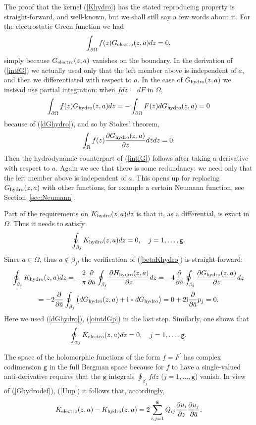 \documentclass[reqno,12pt]{article}
\theoremstyle{plain}
\theoremstyle{definition}
\numberwithin{equation}{section}
\numberwithin{figure}{section}
\def\I{\mathrm{i}}
\begin{document}
The proof that the kernel (\ref{Khydro}) has the stated reproducing property is straight-forward, and well-known,
but we shall still say a few words about it.
For the electrostatic Green function we had
$$
\int_{\partial\Omega}f(z)G_{\rm electro}(z,a)dz=0,
$$
simply because $G_{\rm electro}(z,a)$ vanishes on the boundary. In the derivation of (\ref{intfG}) we actually used only
that the left member above is independent of $a$, and then we differentiated with respect to $a$. In the case of 
$G_{\rm hydro}(z,a)$ we instead use partial integration: when $fdz=dF$ in $\Omega$,
$$
\int_{\partial \Omega}f(z)G_{\rm hydro}(z,a)dz=-\int_{\partial\Omega}F(z)dG_{\rm hydro}(z,a)=0
$$
because of (\ref{dGhydro}), and so by Stokes' theorem,
$$
\int_{ \Omega}f(z)\frac{\partial G_{\rm hydro}(z,a)}{\partial \bar{z}}d\bar{z}dz=0.
$$
Then the hydrodynamic counterpart of (\ref{intfG}) follows after taking a derivative
with respect to $a$. Again we see that there is some redundancy: we need only that the left member above is
independent of $a$. This opens up for replacing $G_{\rm hydro}(z,a)$ with other functions, for example a certain 
Neumann function, see Section~\ref{sec:Neumann}.

Part of the requirements on $K_{\rm hydro}(z,a)dz$ is that it, as a differential, is exact in $\Omega$.
Thus it needs to satisfy
\begin{equation}\label{betaKhydro}
\oint_{\beta_j} K_{\rm hydro}(z,a)dz=0, \quad j=1,\dots, \texttt{g}.
\end{equation}
Since $a\in\Omega$, thus $a\notin \beta_j$, the verification of (\ref{betaKhydro}) is straight-forward:
$$
\oint_{\beta_j} K_{\rm hydro}(z,a)dz=-\frac{2}{\pi}\frac{\partial}{\partial\bar{a}}\oint_{\beta_j}\frac{\partial H_{\rm hydro}(z,a)}{\partial z}dz
=-4\frac{\partial}{\partial\bar{a}}\oint_{\beta_j}\frac{\partial G_{\rm hydro}(z,a)}{\partial z}dz
$$
$$
=-2\frac{\partial}{\partial\bar{a}}\oint_{\beta_j}\big({dG_{\rm hydro}(z,a)}+\I *dG_{\rm hydro} \big)
=0+2\I\frac{\partial }{\partial\bar{a}}p_j =0.
$$
Here we used (\ref{dGhydro}), (\ref{ointdGp}) in the last step. 
Similarly, one shows that
\begin{equation}\label{alphaKelectro}
\oint_{\alpha_j} K_{\rm electro}(z,a)dz=0, \quad j=1,\dots, \texttt{g}.
\end{equation}

The space of the holomorphic functions of the form $f=F^\prime$ has complex  codimension 
$\texttt{g}$ in the full Bergman space 
because for $f$ to have a single-valued anti-derivative requires that the $\texttt{g}$ integrals $\oint_{\beta_j}fdz$
($j=1,\dots,\texttt{g}$) vanish.	
In view of (\ref{Ghydrodef}), (\ref{Uup}) it follows that, accordingly,  
\begin{equation}\label{KKQ} 
K_{\rm electro}(z,a) -K_{\rm hydro}(z,a)
=2\sum_{i,j=1}^\texttt{g} Q_{ij}\frac{\partial u_i}{\partial z}\frac{\partial u_j}{\partial \bar{a}}.
\end{equation}
\end{document}
